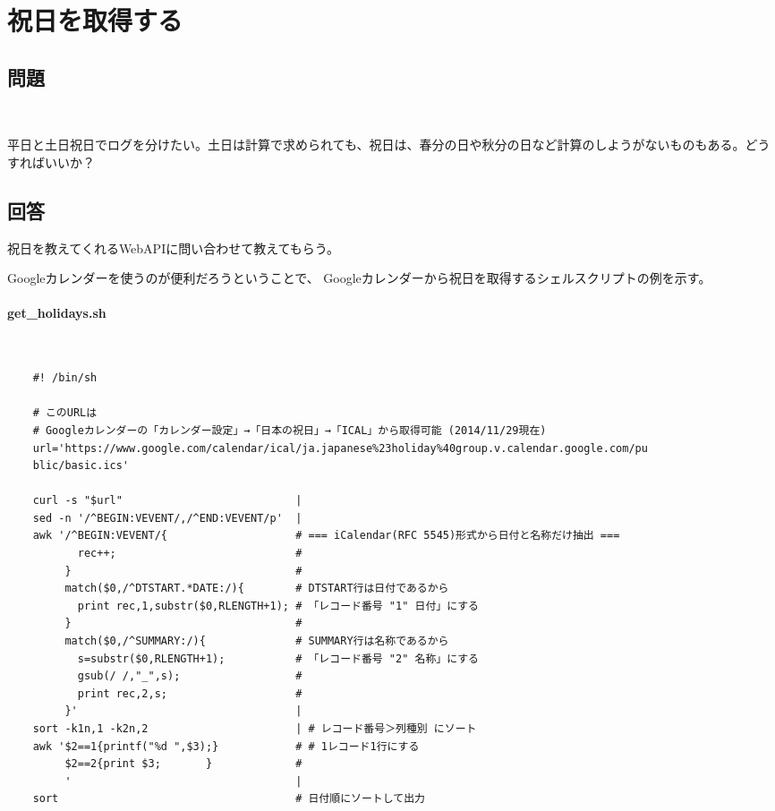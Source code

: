 \section{祝日を取得する}

\subsection*{問題}
\noindent
$\!\!\!\!\!$
\begin{grshfboxit}{160.0mm}
	平日と土日祝日でログを分けたい。土日は計算で求められても、祝日は、春分の日や秋分の日など計算のしようがないものもある。どうすればいいか？
\end{grshfboxit}

\subsection*{回答}
祝日を教えてくれるWebAPIに問い合わせて教えてもらう。

Googleカレンダーを使うのが便利だろうということで、
Googleカレンダーから祝日を取得するシェルスクリプトの例を示す。

\paragraph{get\_{}holidays.sh} 　\\
\begin{frameboxit}{160.0mm}
\begin{verbatim}
	#! /bin/sh

	# このURLは
	# Googleカレンダーの「カレンダー設定」→「日本の祝日」→「ICAL」から取得可能 (2014/11/29現在)
	url='https://www.google.com/calendar/ical/ja.japanese%23holiday%40group.v.calendar.google.com/pu
	blic/basic.ics'

	curl -s "$url"                           |
	sed -n '/^BEGIN:VEVENT/,/^END:VEVENT/p'  |
	awk '/^BEGIN:VEVENT/{                    # === iCalendar(RFC 5545)形式から日付と名称だけ抽出 ===
	       rec++;                            # 
	     }                                   #
	     match($0,/^DTSTART.*DATE:/){        # DTSTART行は日付であるから
	       print rec,1,substr($0,RLENGTH+1); # 「レコード番号 "1" 日付」にする
	     }                                   #
	     match($0,/^SUMMARY:/){              # SUMMARY行は名称であるから
	       s=substr($0,RLENGTH+1);           # 「レコード番号 "2" 名称」にする
	       gsub(/ /,"_",s);                  #
	       print rec,2,s;                    #
	     }'                                  |
	sort -k1n,1 -k2n,2                       | # レコード番号＞列種別 にソート
	awk '$2==1{printf("%d ",$3);}            # # 1レコード1行にする
	     $2==2{print $3;       }             #
	     '                                   |
	sort                                     # 日付順にソートして出力
\end{verbatim}
\end{frameboxit}

